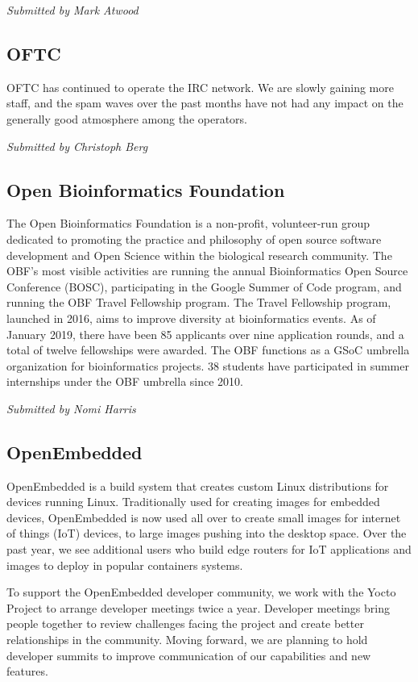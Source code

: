 \documentclass[a4paper]{report}
\begin{document}
{\em Submitted by Mark Atwood}

\subsection{OFTC}

OFTC has continued to operate the IRC network. We are slowly gaining
more staff, and the spam waves over the past months have not had any
impact on the generally good atmosphere among the operators.

{\em Submitted by Christoph Berg}

\subsection{Open Bioinformatics Foundation}

The Open Bioinformatics Foundation is a non-profit, volunteer-run group
dedicated to promoting the practice and philosophy of open source
software development and Open Science within the biological research
community. The OBF's most visible activities are running the annual
Bioinformatics Open Source Conference (BOSC), participating in the
Google Summer of Code program, and running the OBF Travel Fellowship
program. The Travel Fellowship program, launched in 2016, aims to
improve diversity at bioinformatics events. As of January 2019, there
have been 85 applicants over nine application rounds, and a total of
twelve fellowships were awarded. The OBF functions as a GSoC umbrella
organization for bioinformatics projects. 38 students have participated
in summer internships under the OBF umbrella since 2010.

{\em Submitted by Nomi Harris}

\subsection{OpenEmbedded}

OpenEmbedded is a build system that creates custom Linux distributions
for devices running Linux. Traditionally used for creating images for
embedded devices, OpenEmbedded is now used all over to create small
images for internet of things (IoT) devices, to large images pushing
into the desktop space.  Over the past year, we see additional users who
build edge routers for IoT applications and images to deploy in popular
containers systems.

To support the OpenEmbedded developer community, we work with the Yocto
Project to arrange developer meetings twice a year. Developer meetings
bring people together to review challenges facing the project and create
better relationships in the community. Moving forward, we are planning
to hold developer summits to improve communication of our capabilities
and new features.
\end{document}
